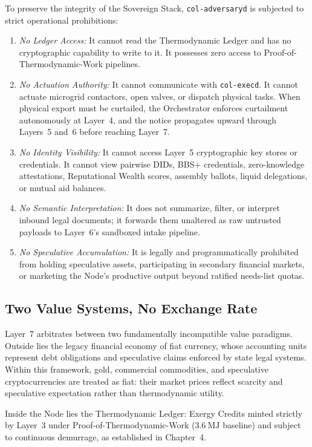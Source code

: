 To preserve the integrity of the Sovereign Stack, \texttt{col-adversaryd} is subjected to strict operational prohibitions:
\begin{enumerate}
  \item \textit{No Ledger Access:} It cannot read the Thermodynamic Ledger and has no cryptographic capability to write to it. It possesses zero access to Proof-of-Thermodynamic-Work pipelines.
  \item \textit{No Actuation Authority:} It cannot communicate with \texttt{col-execd}. It cannot actuate microgrid contactors, open valves, or dispatch physical tasks. When physical export must be curtailed, the Orchestrator enforces curtailment autonomously at Layer~4, and the notice propagates upward through Layers~5 and~6 before reaching Layer~7.
  \item \textit{No Identity Visibility:} It cannot access Layer~5 cryptographic key stores or credentials. It cannot view pairwise DIDs, BBS+ credentials, zero-knowledge attestations, Reputational Wealth scores, assembly ballots, liquid delegations, or mutual aid balances.
  \item \textit{No Semantic Interpretation:} It does not summarize, filter, or interpret inbound legal documents; it forwards them unaltered as raw untrusted payloads to Layer~6's sandboxed intake pipeline.
  \item \textit{No Speculative Accumulation:} It is legally and programmatically prohibited from holding speculative assets, participating in secondary financial markets, or marketing the Node's productive output beyond ratified needs-list quotas.
\end{enumerate}

\subsection{Two Value Systems, No Exchange Rate}

Layer~7 arbitrates between two fundamentally incompatible value paradigms. Outside lies the legacy financial economy of fiat currency, whose accounting units represent debt obligations and speculative claims enforced by state legal systems. Within this framework, gold, commercial commodities, and speculative cryptocurrencies are treated as fiat: their market prices reflect scarcity and speculative expectation rather than thermodynamic utility.

Inside the Node lies the Thermodynamic Ledger: Exergy Credits minted strictly by Layer~3 under Proof-of-Thermodynamic-Work ($3.6\mathrm{\ MJ}$ baseline) and subject to continuous demurrage, as established in Chapter~4.

